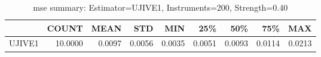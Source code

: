 \begin{table}[ht]
\centering
\caption{mse summary: Estimator=UJIVE1, Instruments=200, Strength=0.40}
\begin{tabular}{lrrrrrrrr}
\toprule
 & COUNT & MEAN & STD & MIN & 25\% & 50\% & 75\% & MAX \\
\midrule
UJIVE1 & 10.0000 & 0.0097 & 0.0056 & 0.0035 & 0.0051 & 0.0093 & 0.0114 & 0.0213 \\
\bottomrule
\end{tabular}
\end{table}
